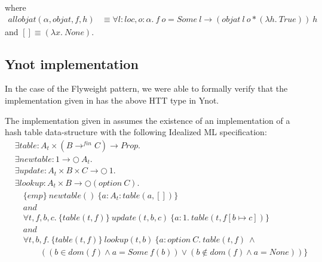 \documentclass[a4paper,english]{article}
\newcommand{\PROP}[0]{Prop}
\newcommand{\MONAD}[0]{\bigcirc}
\newcommand{\AND}[0]{and}
\newcommand{\LOC}[0]{loc}
\newcommand{\OPTION}[0]{option}
\newcommand{\TRUE}[0]{True}
\begin{document}
where
\begin{align*}
allobjat(\alpha, objat, f, h) &\equiv \forall l : \LOC, o : \alpha.\ f\ o = Some\ l \rightarrow (objat\ l\ o * (\lambda h.\ \TRUE))\ h
\end{align*}
and $[] \equiv (\lambda x.\ None)$.

\subsection{Ynot implementation}

In the case of the Flyweight pattern, we were able to formally verify that the
implementation given in \cite{patterns} has the above HTT type in Ynot. 

The implementation given in \cite{patterns} assumes the existence of an
implementation of a hash table data-structure with the following Idealized ML
specification:
\begin{align*}
&\exists table : A_t \times (B \rightarrow^{fin} C) \rightarrow \PROP.\\
&\exists newtable: 1 \rightarrow \MONAD\ A_t.\\
&\exists update : A_t \times B \times C \rightarrow \MONAD\ 1.\\
&\exists lookup : A_t \times B \rightarrow \MONAD(\OPTION\ C).\\
&\quad \{ emp \}\ newtable()\ \{ a : A_t: table(a, [])\}\\
&\quad\AND\\
&\quad \forall t, f, b, c.\ \{ table(t, f) \}\ update(t, b, c)\ \{ a : 1.\ table(t, f[b \mapsto c]) \}\\
&\quad\AND\\
&\quad \forall t, b, f.\ \{ table(t, f) \}\ lookup(t, b)\ \{ a : option\ C.\ table(t, f)\ \land\\
&\quad\quad\quad ((b \in dom(f) \land a = Some\ f(b)) \lor (b \not\in dom(f) \land a = None)) \}
\end{align*}
\end{document}

